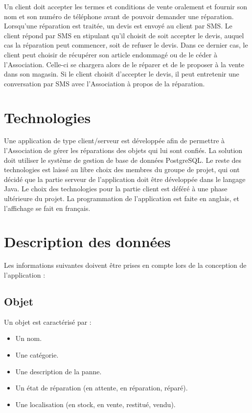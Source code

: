 \documentclass{article}
\begin{document}
Un client doit accepter les termes et conditions de vente oralement et fournir son nom et son numéro de téléphone avant de pouvoir demander une réparation. Lorsqu'une réparation est traitée, un devis est envoyé au client par SMS. Le client répond par SMS en stipulant qu'il choisit de soit accepter le devis, auquel cas la réparation peut commencer, soit de refuser le devis. Dans ce dernier cas, le client peut choisir de récupérer son article endommagé ou de le céder à l'Association. Celle-ci se chargera alors de le réparer et de le proposer à la vente dans son magasin. Si le client choisit d'accepter le devis, il peut entretenir une conversation par SMS avec l'Association à propos de la réparation.

\section{Technologies}
Une application de type client/serveur est développée afin de permettre à l'Association de gérer les réparations des objets qui lui sont confiés. La solution doit utiliser le système de gestion de base de données PostgreSQL. Le reste des technologies est laissé au libre choix des membres du groupe de projet, qui ont décidé que la partie serveur de l'application doit être développée dans le langage Java. Le choix des technologies pour la partie client est déféré à une phase ultérieure du projet. La programmation de l'application est faite en anglais, et l'affichage se fait en français.

\section{Description des données}
Les informations suivantes doivent être prises en compte lors de la conception de l'application :

\subsection*{Objet}
Un objet est caractérisé par :
\begin{itemize}
    \item Un nom.
    \item Une catégorie.
    \item Une description de la panne.
    \item Un état de réparation (en attente, en réparation, réparé).
    \item Une localisation (en stock, en vente, restitué, vendu).
\end{itemize}
\end{document}
